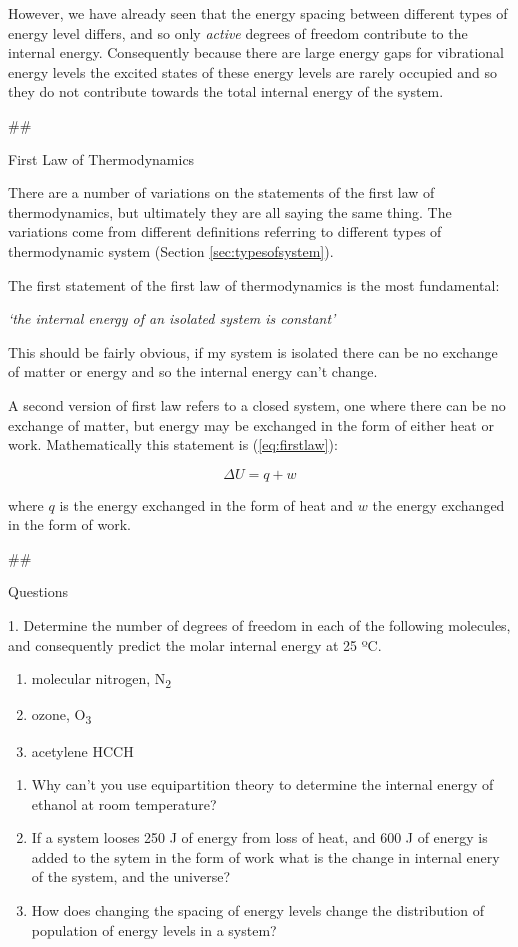 \documentclass[
]{book}
\providecommand{\tightlist}{%
  \setlength{\itemsep}{0pt}\setlength{\parskip}{0pt}}
\begin{document}
However, we have already seen that the energy spacing between different types of energy level differs, and so only \emph{active} degrees of freedom contribute to the internal energy. Consequently because there are large energy gaps for vibrational energy levels the excited states of these energy levels are rarely occupied and so they do not contribute towards the total internal energy of the system.

\#\#

First Law of Thermodynamics

There are a number of variations on the statements of the first law of thermodynamics, but ultimately they are all saying the same thing. The variations come from different definitions referring to different types of thermodynamic system (Section \ref{sec:typesofsystem}).

The first statement of the first law of thermodynamics is the most fundamental:

\emph{`the internal energy of an isolated system is constant'}

This should be fairly obvious, if my system is isolated there can be no exchange of matter or energy and so the internal energy can't change.

A second version of first law refers to a closed system, one where there can be no exchange of matter, but energy may be exchanged in the form of either heat or work. Mathematically this statement is (\eqref{eq:firstlaw}):

\begin{equation}
\Delta U = q + w
\label{eq:firstlaw}
\end{equation}

where \(q\) is the energy exchanged in the form of heat and \(w\) the energy exchanged in the form of work.

\#\#

Questions

1. Determine the number of degrees of freedom in each of the following molecules, and consequently predict the molar internal energy at 25 ºC.

\begin{enumerate}
\def\labelenumi{\alph{enumi}.}
\tightlist
\item
  molecular nitrogen, N\textsubscript{2}
\item
  ozone, O\textsubscript{3}
\item
  acetylene HCCH
\end{enumerate}

\begin{enumerate}
\def\labelenumi{\arabic{enumi}.}
\setcounter{enumi}{1}
\item
  Why can't you use equipartition theory to determine the internal energy of ethanol at room temperature?
\item
  If a system looses 250 J of energy from loss of heat, and 600 J of energy is added to the sytem in the form of work what is the change in internal enery of the system, and the universe?
\item
  How does changing the spacing of energy levels change the distribution of population of energy levels in a system?
\end{enumerate}
\end{document}
